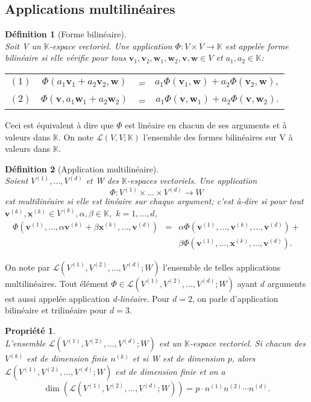 \documentclass[11pt,a4paper,oneside]{book}
\newtheorem{defi}{Définition}[chapter]
\newtheorem{propp}{Propriété}[chapter]
\def\K{\mathbb K}
\def\L{\mathcal L}
\def\v{\mathbf v}
\def\x{\mathbf x}
\def\w{\mathbf w}
\begin{document}
\subsection{Applications  multilinéaires}
\begin{defi}[Forme bilinéaire]
\emph{\\}
Soit V un $ \K $-espace vectoriel. Une application $ \Phi :V\times V\rightarrow\K $
est appelée forme bilinéaire si elle vérifie pour tous  $\v_{1}, \v_{2},\w_{1},\w_{2}, \v,\w \in V$ et $a_{1}, a_{2}\in \K $:
\begin{center}
\begin{tabular}{cccc}
	$ (1) $&$ \Phi(a_{1}\v_{1}+a_{2}\v_{2},\w) $&=&$ a_{1}\Phi(\v_{1},\w)+a_{2}\Phi(\v_{2},\w), $\\
	$ (2) $&$ \Phi(\v,a_{1}\w_{1}+a_{2}\w_{2}) $&=&$ a_{1}\Phi(\v,\w_{1})+a_{2}\Phi(\v,\w_{2}).$\\
\end{tabular}
\end{center}
\end{defi}
Ceci est équivalent à dire que $\Phi$ est linéaire en chacun de ses arguments et à valeurs dans $ \K $. 
On note $ \L(V,V;\K) $ l'ensemble des formes bilinéaires sur V à valeurs dans $ \K $.
\begin{defi}[Application multilinéaire]
	\emph{\\}
	 Soient $V^{(1)}, \ldots, V^{(d)}$ et W des $ \K $-espaces vectoriels. Une application $$ \Phi :V^{(1)}\times \dots\times V^{(d)}\longrightarrow W $$ est multilinéaire si elle est linéaire sur chaque argument; c'est à-dire si pour tout\\  $\v^{(k)},\x^{(k)}\in V^{(k)}, \alpha,\beta\in \mathbb{K},$ $ k=1,\dots,d $,
	\begin{eqnarray}
		\Phi\left(\v^{(1)},\dots,\alpha \v^{(k)}+\beta \x^{(k)},\dots,\v^{(d)}\right)&=&\alpha \Phi\left(\v^{(1)},\dots,\v^{(k)},\dots,\v^{(d)}\right)+\nonumber\\
		&&\beta\Phi\left(\v^{(1)},\dots, \x^{(k)},\dots,\v^{(d)}\right).
	\end{eqnarray}
	
\end{defi}

On note par $ \L\left(V^{(1)},V^{(2)},\dots,V^{(d)}; W\right)$ l'ensemble de telles applications multilinéaires. Tout élément $ \Phi\in \L\left(V^{(1)},V^{(2)},\dots,V^{(d)}; W\right) $ ayant $ d $ arguments est aussi appelée application \textit{d-linéaire}. Pour $ d = 2 $, on parle
d'application bilinéaire et trilinéaire pour $ d = 3 $.
\begin{propp}\label{propdim}
\emph{\\}
L'ensemble  $ \L\left(V^{(1)},V^{(2)},\dots,V^{(d)}; W\right)$ est un $ \K $-espace vectoriel. Si chacun des $ V^{(k)}$ est de
dimension finie $ n^{(k)} $ et si W est de dimension $ p $, alors  $ \L\left(V^{(1)},V^{(2)},\dots,V^{(d)}; W\right)$ est de dimension finie et on a
\begin{equation}\label{dimmulti}
\dim\left(\L\left(V^{(1)},V^{(2)},\dots,V^{(d)}; W\right)\right)=p \cdot n^{(1)}n^{(2)}\cdots n^{(d)}.
\end{equation}
\end{propp}
\end{document}
